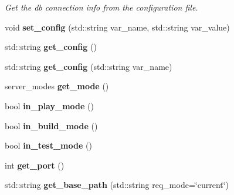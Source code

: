 \begin{DoxyCompactItemize}
\begin{DoxyCompactList}\small\item\em Get the db connection info from the configuration file. \end{DoxyCompactList}\item 
\hypertarget{classrpie_1_1server_a79b7cfd755ff68761de7d8b4aa6ed5c4}{void {\bfseries set\-\_\-config} (std\-::string var\-\_\-name, std\-::string var\-\_\-value)}\label{classrpie_1_1server_a79b7cfd755ff68761de7d8b4aa6ed5c4}

\item 
\hypertarget{classrpie_1_1server_a0a76549ab2136a685e9b84ae8bc6bf5a}{std\-::string {\bfseries get\-\_\-config} ()}\label{classrpie_1_1server_a0a76549ab2136a685e9b84ae8bc6bf5a}

\item 
\hypertarget{classrpie_1_1server_a3db1b71f9fd132bccc92c71451a29f61}{std\-::string {\bfseries get\-\_\-config} (std\-::string var\-\_\-name)}\label{classrpie_1_1server_a3db1b71f9fd132bccc92c71451a29f61}

\item 
\hypertarget{classrpie_1_1server_a122efa348d71c17be7def0a2569b5857}{server\-\_\-modes {\bfseries get\-\_\-mode} ()}\label{classrpie_1_1server_a122efa348d71c17be7def0a2569b5857}

\item 
\hypertarget{classrpie_1_1server_a1a59fdd2b750ce6f44849457555bf545}{bool {\bfseries in\-\_\-play\-\_\-mode} ()}\label{classrpie_1_1server_a1a59fdd2b750ce6f44849457555bf545}

\item 
\hypertarget{classrpie_1_1server_a1197ec8dd887726c6a5ae0158aecd69d}{bool {\bfseries in\-\_\-build\-\_\-mode} ()}\label{classrpie_1_1server_a1197ec8dd887726c6a5ae0158aecd69d}

\item 
\hypertarget{classrpie_1_1server_a279755eaeae1526dcfb7c3382f154e60}{bool {\bfseries in\-\_\-test\-\_\-mode} ()}\label{classrpie_1_1server_a279755eaeae1526dcfb7c3382f154e60}

\item 
\hypertarget{classrpie_1_1server_ab88c2d9b84f0288f3d0ebbd44f4f3983}{int {\bfseries get\-\_\-port} ()}\label{classrpie_1_1server_ab88c2d9b84f0288f3d0ebbd44f4f3983}

\item 
\hypertarget{classrpie_1_1server_a48096cd3ff72978503226eaddd8f8780}{std\-::string {\bfseries get\-\_\-base\-\_\-path} (std\-::string req\-\_\-mode=\char`\"{}current\char`\"{})}\label{classrpie_1_1server_a48096cd3ff72978503226eaddd8f8780}

\end{DoxyCompactItemize}
